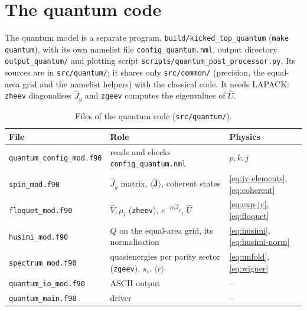 \documentclass[11pt,a4paper]{article}
\newcommand{\vJ}{\bm{J}}
\begin{document}

\section{The quantum code}\label{sec:qcode}

The quantum model is a separate program, \texttt{build/kicked\_top\_quantum} (\texttt{make quantum}), with its own
namelist file \texttt{config\_quantum.nml}, output directory \texttt{output\_quantum/} and plotting script
\texttt{scripts/quantum\_post\_processor.py}. Its sources are in \texttt{src/quantum/}; it shares only
\texttt{src/common/} (precision, the equal-area grid and the namelist helpers) with the classical code. It needs
LAPACK: \texttt{zheev} diagonalises $\hat J_y$ and \texttt{zgeev} computes the eigenvalues of $\hat U$.

\begin{table}[h]
\centering\small
\begin{tabular}{lll}
\toprule
File & Role & Physics \\
\midrule
\texttt{quantum\_config\_mod.f90} & reads and checks \texttt{config\_quantum.nml} & $p, k, j$ \\
\texttt{spin\_mod.f90} & $\hat J_y$ matrix, $\langle\hat{\vJ}\rangle$, coherent states & \eqref{eq:jy-elements}, \eqref{eq:coherent} \\
\texttt{floquet\_mod.f90} & $\hat V, \mu_l$ (\texttt{zheev}), $e^{-i\alpha\hat J_y}$, $\hat U$ & \eqref{eq:exp-jy}, \eqref{eq:floquet} \\
\texttt{husimi\_mod.f90} & $Q$ on the equal-area grid, its normalisation & \eqref{eq:husimi}, \eqref{eq:husimi-norm} \\
\texttt{spectrum\_mod.f90} & quasienergies per parity sector (\texttt{zgeev}), $s_i$, $\langle r\rangle$ & \eqref{eq:unfold}, \eqref{eq:wigner} \\
\texttt{quantum\_io\_mod.f90} & ASCII output & -- \\
\texttt{quantum\_main.f90} & driver & -- \\
\bottomrule
\end{tabular}
\caption{Files of the quantum code (\texttt{src/quantum/}).}
\label{tab:qmodules}
\end{table}
\end{document}
